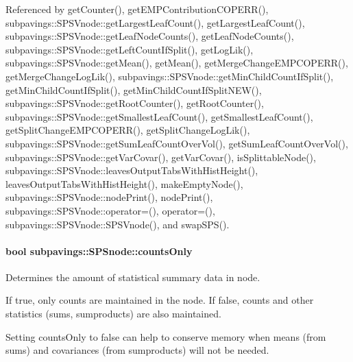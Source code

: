 \-Referenced by get\-Counter(), get\-E\-M\-P\-Contribution\-C\-O\-P\-E\-R\-R(), subpavings\-::\-S\-P\-S\-Vnode\-::get\-Largest\-Leaf\-Count(), get\-Largest\-Leaf\-Count(), subpavings\-::\-S\-P\-S\-Vnode\-::get\-Leaf\-Node\-Counts(), get\-Leaf\-Node\-Counts(), subpavings\-::\-S\-P\-S\-Vnode\-::get\-Left\-Count\-If\-Split(), get\-Log\-Lik(), subpavings\-::\-S\-P\-S\-Vnode\-::get\-Mean(), get\-Mean(), get\-Merge\-Change\-E\-M\-P\-C\-O\-P\-E\-R\-R(), get\-Merge\-Change\-Log\-Lik(), subpavings\-::\-S\-P\-S\-Vnode\-::get\-Min\-Child\-Count\-If\-Split(), get\-Min\-Child\-Count\-If\-Split(), get\-Min\-Child\-Count\-If\-Split\-N\-E\-W(), subpavings\-::\-S\-P\-S\-Vnode\-::get\-Root\-Counter(), get\-Root\-Counter(), subpavings\-::\-S\-P\-S\-Vnode\-::get\-Smallest\-Leaf\-Count(), get\-Smallest\-Leaf\-Count(), get\-Split\-Change\-E\-M\-P\-C\-O\-P\-E\-R\-R(), get\-Split\-Change\-Log\-Lik(), subpavings\-::\-S\-P\-S\-Vnode\-::get\-Sum\-Leaf\-Count\-Over\-Vol(), get\-Sum\-Leaf\-Count\-Over\-Vol(), subpavings\-::\-S\-P\-S\-Vnode\-::get\-Var\-Covar(), get\-Var\-Covar(), is\-Splittable\-Node(), subpavings\-::\-S\-P\-S\-Vnode\-::leaves\-Output\-Tabs\-With\-Hist\-Height(), leaves\-Output\-Tabs\-With\-Hist\-Height(), make\-Empty\-Node(), subpavings\-::\-S\-P\-S\-Vnode\-::node\-Print(), node\-Print(), subpavings\-::\-S\-P\-S\-Vnode\-::operator=(), operator=(), subpavings\-::\-S\-P\-S\-Vnode\-::\-S\-P\-S\-Vnode(), and swap\-S\-P\-S().

\hypertarget{classsubpavings_1_1SPSnode_a99af67614faaf93216ec0991e96ddb02}{
\paragraph[{counts\-Only}]{\setlength{\rightskip}{0pt plus 5cm}bool {\bf subpavings\-::\-S\-P\-Snode\-::counts\-Only}}}\label{classsubpavings_1_1SPSnode_a99af67614faaf93216ec0991e96ddb02}


\-Determines the amount of statistical summary data in node. 

\-If true, only counts are maintained in the node. \-If false, counts and other statistics (sums, sumproducts) are also maintained.

\-Setting counts\-Only to false can help to conserve memory when means (from sums) and covariances (from sumproducts) will not be needed. 

